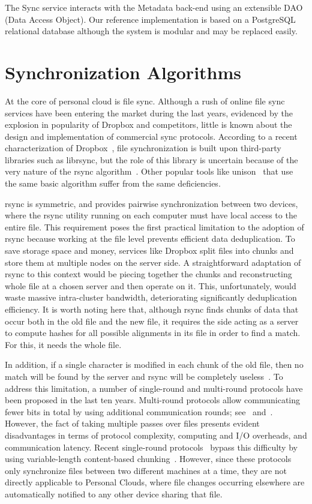 The Sync service interacts with the Metadata back-end using an extensible DAO (Data Access Object). Our reference implementation is based on a PostgreSQL relational database although the system is modular and may be replaced easily.


\section{Synchronization Algorithms}

At the core of personal cloud is file sync. Although a rush of online file sync services have
been entering the market during the last years, evidenced by the explosion in popularity of
Dropbox and competitors, little is known about the design and implementation of commercial
sync protocols. According to a recent characterization of Dropbox~\cite{drago2012inside}, file synchronization
is built upon third-party libraries such as librsync, but the role of this library is uncertain
because of the very nature of the rsync algorithm~\cite{tridgell96rsync}. Other popular tools like 
unison~\cite{unison} that use the same basic algorithm suffer from the same deficiencies.

rsync is symmetric, and provides pairwise synchronization between two devices, where the rsync
utility running on each computer must have local access to the entire file. This requirement
poses the first practical limitation to the adoption of rsync because working at the file level
prevents efficient data deduplication. To save storage space and money, services like Dropbox
split files into chunks and store them at multiple nodes on the server side. A straightforward
adaptation of rsync to this context would be piecing together the chunks and reconstructing
whole file at a chosen server and then operate on it. This, unfortunately, would waste massive
intra-cluster bandwidth, deteriorating significantly deduplication efficiency. It is worth
noting here that, although rsync finds chunks of data that occur both in the old file and the
new file, it requires the side acting as a server to compute hashes for all possible alignments
in its file in order to find a match. For this, it needs the whole file.  

In addition, if a single character is modified in each chunk of the old file, then no match
will be found by the server and rsync will be completely useless~\cite{langford01}. To address this limitation,
a number of single-round and multi-round protocols have been proposed in the last ten years. 
Multi-round protocols allow communicating fewer bits in total by using additional communication
rounds; see~\cite{langford01} and~\cite{suel04}. However, the fact of taking multiple passes over files presents evident
disadvantages in terms of protocol complexity, computing and I/O overheads, and communication
latency. Recent single-round protocols~\cite{irmak05}\cite{hao08} bypass this difficulty by using variable-length
content-based chunking~\cite{Muthitacharoen01}. However, since these protocols only synchronize files between two
different machines at a time, they are not directly applicable to Personal Clouds, where file
changes occurring elsewhere are automatically notified to any other device sharing that file. 

